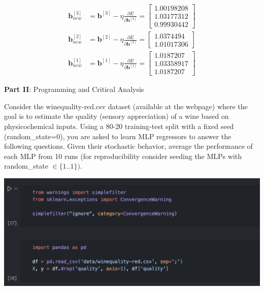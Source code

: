 \documentclass[12pt]{article}
\begin{document}
\begin{enumerate}[leftmargin=\labelsep]
    \begin{equation}
    \begin{aligned}
        \mathbf{b}_{new}^{[3]} &= \mathbf{b}^{[3]} - \eta \frac{\partial E}{\partial \mathbf{b}^{[3]}}
        = \begin{bmatrix}
            1.00198208 \\ 1.03177312 \\ 0.99930442
            \end{bmatrix} \\
        \mathbf{b}_{new}^{[2]} &= \mathbf{b}^{[2]} - \eta \frac{\partial E}{\partial \mathbf{b}^{[2]}}
        = \begin{bmatrix}
            1.0374494 \\ 1.01017306
        \end{bmatrix} \\
        \mathbf{b}_{new}^{[1]} &= \mathbf{b}^{[1]} - \eta \frac{\partial E}{\partial \mathbf{b}^{[1]}}
        = \begin{bmatrix}
            1.0187207 \\ 1.03358917 \\ 1.0187207 
            \end{bmatrix}
    \end{aligned}
    \end{equation}

\end{enumerate}

\vskip 10cm

\large{\textbf{Part II}: Programming and Critical Analysis}\normalsize

Consider the winequality-red.csv dataset (available at the webpage) where the goal is to estimate
the quality (sensory appreciation) of a wine based on physicochemical inputs.
Using a 80-20 training-test split with a fixed seed (random\_state=0), you are asked to learn MLP
regressors to answer the following questions.
Given their stochastic behavior, average the performance of each MLP from 10 runs
(for reproducibility consider seeding the MLPs with random\_state $\in \{1. .1\})$.

\begin{center}
    \includegraphics[scale=0.6]{images/code6.png}
\end{center}
\end{document}
